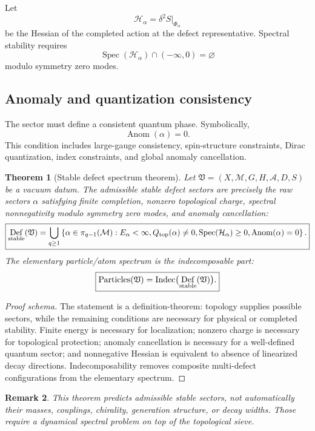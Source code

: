 \documentclass[11pt]{article}
\newtheorem{theorem}{Theorem}[section]
\newtheorem{remark}[theorem]{Remark}
\DeclareMathOperator{\Spec}{Spec}
\DeclareMathOperator{\Def}{Def}
\DeclareMathOperator{\Anom}{Anom}
\DeclareMathOperator{\Indec}{Indec}
\newcommand{\Hess}{\mathcal H}
\newcommand{\V}{\mathfrak V}
\newcommand{\A}{\mathcal A}
\newcommand{\M}{\mathcal M}
\begin{document}
Let
\[
\boxed{
        \Hess_\alpha=\delta^2 S\big|_{\Phi_\alpha}
}
\]
be the Hessian of the completed action at the defect representative. Spectral stability requires
\[
\boxed{
        \Spec(\Hess_\alpha)\cap(-\infty,0)=\varnothing
}
\]
modulo symmetry zero modes.

\subsection{Anomaly and quantization consistency}

The sector must define a consistent quantum phase. Symbolically,
\[
\boxed{
        \Anom(\alpha)=0.
}
\]
This condition includes large-gauge consistency, spin-structure constraints, Dirac quantization, index constraints, and global anomaly cancellation.

\begin{theorem}[Stable defect spectrum theorem]
Let $\V=(X,\M,G,H,\A,D,S)$ be a vacuum datum. The admissible stable defect sectors are precisely the raw sectors $\alpha$ satisfying finite completion, nonzero topological charge, spectral nonnegativity modulo symmetry zero modes, and anomaly cancellation:
\[
\boxed{
\Def_{\rm stable}(\V)
=
\bigcup_{q\ge1}
\left\{
\alpha\in\pi_{q-1}(\M):
E_\alpha<\infty,
Q_{\rm top}(\alpha)\ne0,
\Spec(\Hess_\alpha)\ge0,
\Anom(\alpha)=0
\right\}.
}
\]
The elementary particle/atom spectrum is the indecomposable part:
\[
\boxed{
        \mathrm{Particles}(\V)=\Indec\bigl(\Def_{\rm stable}(\V)\bigr).
}
\]
\end{theorem}

\begin{proof}[Proof schema]
The statement is a definition-theorem: topology supplies possible sectors, while the remaining conditions are necessary for physical or completed stability. Finite energy is necessary for localization; nonzero charge is necessary for topological protection; anomaly cancellation is necessary for a well-defined quantum sector; and nonnegative Hessian is equivalent to absence of linearized decay directions. Indecomposability removes composite multi-defect configurations from the elementary spectrum.
\end{proof}

\begin{remark}
This theorem predicts admissible stable sectors, not automatically their masses, couplings, chirality, generation structure, or decay widths. Those require a dynamical spectral problem on top of the topological sieve.
\end{remark}
\end{document}
